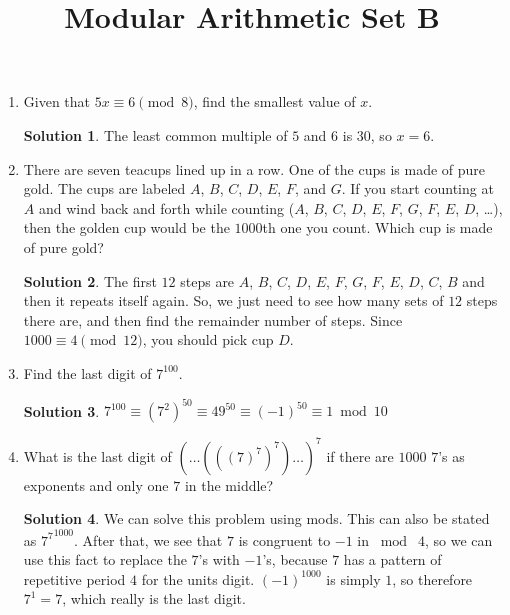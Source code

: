 \documentclass{article}
\title{Modular Arithmetic Set B}
\date{}
\author{}
\theoremstyle{definition}
\newtheorem*{solution}{Solution}
\begin{document}
\maketitle
\begin{multicols}{2}
    \raggedcolumns
    \begin{enumerate}
        \item Given that $5x \equiv 6 \pmod{8}$, find the smallest value of $x$.
            \begin{solution}
                The least common multiple of $5$ and $6$ is $30$, so $x = 6$.
            \end{solution}
        \item There are seven teacups lined up in a row.
            One of the cups is made of pure gold.
            The cups are labeled $A$, $B$, $C$, $D$, $E$, $F$, and $G$.
            If you start counting at $A$ and wind back and forth while counting ($A$, $B$, $C$, $D$, $E$, $F$, $G$, $F$, $E$, $D$, \dots), then the golden cup would be the $1000$th one you count.
            Which cup is made of pure gold?
            \begin{solution}
                The first $12$ steps are $A$, $B$, $C$, $D$, $E$, $F$, $G$, $F$, $E$, $D$, $C$, $B$ and then it repeats itself again.
                So, we just need to see how many sets of $12$ steps there are, and then find the remainder number of steps.
                Since $1000 \equiv 4 \pmod{12}$, you should pick cup $D$.
            \end{solution}
        \item Find the last digit of $7^{100}$.
            \begin{solution}
                $7^{100} \equiv \left( 7^2 \right)^{50} \equiv 49^{50} \equiv (-1)^{50} \equiv 1 \bmod 10$
            \end{solution}
        \item What is the last digit of $(\dots(((7)^7)^7)\dots)^7$ if there are $1000$ $7$'s as exponents and only one $7$ in the middle?
            \begin{solution}
                We can solve this problem using mods.
                This can also be stated as ${7^7}^{1000}$.
                After that, we see that $7$ is congruent to $-1$ in $\bmod \; 4$, so we can use this fact to replace the $7$'s with $-1$'s, because $7$ has a pattern of repetitive period $4$ for the units digit.
                $(-1)^{1000}$ is simply $1$, so therefore $7^1 = 7$, which really is the last digit.
            \end{solution}

\end{enumerate}
\end{multicols}
\end{document}
